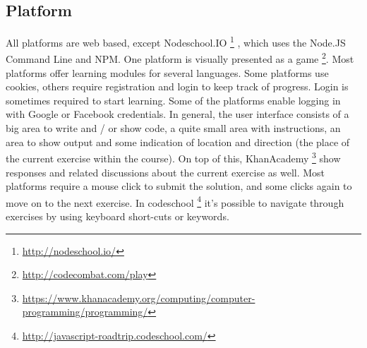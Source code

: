 \documentclass{article}
\begin{document}
\subsection{Platform}
All platforms are web based, except Nodeschool.IO
\footnote{\url{http://nodeschool.io/}}
, which uses the Node.JS 
Command Line and NPM. One platform is visually presented as a game
\footnote{\url{http://codecombat.com/play}}. Most platforms offer learning
modules for several languages. Some platforms use cookies, 
others require registration and login to keep track of progress. Login is 
sometimes required to start learning. Some of the platforms enable logging in 
with Google or Facebook credentials. \newline
In general, the user interface consists of a big area to write and / or show 
code, a quite small area with instructions, an area to show output and some 
indication of location and direction (the place of the current exercise within 
the course). On top of this, KhanAcademy
\footnote{
\url{https://www.khanacademy.org/computing/computer-programming/programming/}} 
show responses and related discussions about the current exercise as well. Most
platforms require a mouse click to submit the solution, and some clicks again to
move on to the next exercise. In codeschool
\footnote{\url{http://javascript-roadtrip.codeschool.com/}} 
it's possible to navigate through exercises by using keyboard short-cuts or 
keywords.
\end{document}
